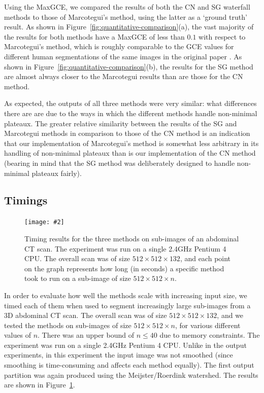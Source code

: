 \documentclass[preprint,a4paper]{elsarticle}
\newcommand{\stufigex}[5]					%
{
	\begin{figure}[#5]
	\begin{center}
		\texttt{[image: \#2]}
		\caption{#3}
		\label{#4}
	\end{center}
	\end{figure}
}
\begin{document}
Using the MaxGCE, we compared the results of both the CN and SG waterfall methods to those of Marcotegui's method, using the latter as a `ground truth' result. As shown in Figure~\ref{fig:quantitative-comparison}(a), the vast majority of the results for both methods have a MaxGCE of less than $0.1$ with respect to Marcotegui's method, which is roughly comparable to the GCE values for different human segmentations of the same images in the original paper \cite{martin01}. As shown in Figure~\ref{fig:quantitative-comparison}(b), the results for the SG method are almost always closer to the Marcotegui results than are those for the CN method.

As expected, the outputs of all three methods were very similar: what differences there are are due to the ways in which the different methods handle non-minimal plateaux. The greater relative similarity between the results of the SG and Marcotegui methods in comparison to those of the CN method is an indication that our implementation of Marcotegui's method is somewhat less arbitrary in its handling of non-minimal plateaux than is our implementation of the CN method (bearing in mind that the SG method was deliberately designed to handle non-minimal plateaux fairly).

\subsection{Timings}

\stufigex{width=.95\linewidth}{timings.png}{Timing results for the three methods on sub-images of an abdominal CT scan. The experiment was run on a single 2.4GHz Pentium 4 CPU. The overall scan was of size $512 \times 512 \times 132$, and each point on the graph represents how long (in seconds) a specific method took to run on a sub-image of size $512 \times 512 \times n$.}{fig:timings}{!t}

In order to evaluate how well the methods scale with increasing input size, we timed each of them when used to segment increasingly large sub-images from a 3D abdominal CT scan\footnotemark{}. The overall scan was of size $512 \times 512 \times 132$, and we tested the methods on sub-images of size $512 \times 512 \times n$, for various different values of $n$. There was an upper bound of $n \le 40$ due to memory constraints. The experiment was run on a single 2.4GHz Pentium 4 CPU. Unlike in the output experiments, in this experiment the input image was not smoothed (since smoothing is time-consuming and affects each method equally). The first output partition was again produced using the Meijster/Roerdink watershed. The results are shown in Figure~\ref{fig:timings}.
\end{document}
